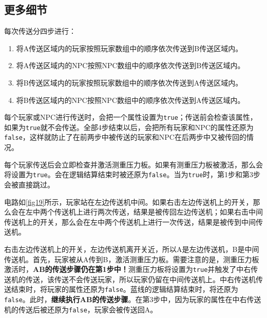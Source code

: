 \subsection{更多细节}\label{sec9}
每次传送分四步进行：
\begin{enumerate}
  \item 将A传送区域内的玩家按照玩家数组中的顺序依次传送到B传送区域内。
  \item 将A传送区域内的NPC按照NPC数组中的顺序依次传送到B传送区域内。
  \item 将B传送区域内的玩家按照玩家数组中的顺序依次传送到A传送区域内。
  \item 将B传送区域内的NPC按照NPC数组中的顺序依次传送到A传送区域内。
\end{enumerate}

每个玩家或NPC进行传送时，会把一个属性设置为\lstinline{true}；传送前会检查该属性，如果为\lstinline{true}就不会传送。全部4步结束以后，会把所有玩家和NPC的属性还原为\lstinline{false}，这样就防止了在前两步中被传送的玩家和NPC在后两步中又被传回的情况。

每个玩家传送后会立即检查并激活测重压力板。如果有测重压力板被激活，那么会将设置为\lstinline{true}。会在逻辑结算结束时被还原为\lstinline{false}。当为\lstinline{true}时，第1步和第3步会被直接跳过。

\begin{example}{}{}
  电路如\autoref{fig19}所示，玩家站在左边传送机中间。如果右击左边传送机上的开关，那么会在左中两个传送机上进行两次传送，结果是被传回左边传送机；如果右击中间传送机上的开关，那么会在左中两个传送机上进行一次传送，结果是被传到中间传送机。

  \begin{figure}[H]
    \centering
    \caption{}\label{fig19}
  \end{figure}

  右击左边传送机上的开关，左边传送机离开关近，所以A是左边传送机，B是中间传送机。首先，玩家被从A传到B，激活测重压力板。需要注意的是，测重压力板激活时，\textbf{AB的传送步骤仍在第1步中！}测重压力板将设置为\lstinline{true}并触发了中右传送机的传送，该传送不会传送玩家，所以玩家仍留在中间传送机上。中右传送机传送结束时，将玩家的属性还原为\lstinline{false}。蓝线的逻辑结算结束时，将还原为\lstinline{false}。此时，\textbf{继续执行AB的传送步骤}。在第3步中，因为玩家的属性在中右传送机的传送后被还原为\lstinline{false}，玩家会被传送回A。
\end{example}

